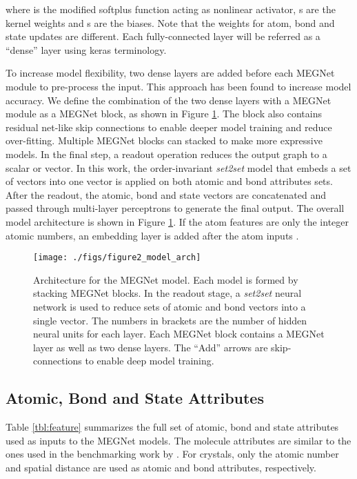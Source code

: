 \documentclass[manuscript=article]{achemso}
\begin{document}
where  is the modified softplus function\cite{Schutt2017} acting as nonlinear activator, s are the kernel weights and s are the biases. Note that the weights for atom, bond and state updates are different. Each fully-connected layer will be referred as a ``dense'' layer using keras\cite{chollet2015keras} terminology. 

To increase model flexibility, two dense layers are added before each MEGNet module to pre-process the input. This approach has been found to increase model accuracy. We define the combination of the two dense layers with a MEGNet module as a MEGNet block, as shown in Figure \ref{fig:model_arch}. The block also contains residual net-like\cite{he2016deep} skip connections to enable deeper model training and reduce over-fitting. Multiple MEGNet blocks can stacked to make more expressive models.  In the final step, a readout operation reduces the output graph to a scalar or vector. In this work, the order-invariant \textit{set2set} model\cite{Vinyals2015} that embeds a set of vectors into one vector is applied on both atomic and bond attributes sets. After the readout, the atomic, bond and state vectors are concatenated and passed through multi-layer perceptrons to generate the final output. The overall model architecture is shown in Figure \ref{fig:model_arch}. If the atom features are only the integer atomic numbers, an embedding layer is added after the atom inputs .

\begin{figure}[htp]
\texttt{[image: ./figs/figure2\_model\_arch]}
\caption{\label{fig:model_arch}Architecture for the MEGNet model. Each model is formed by stacking MEGNet blocks. In the readout stage, a \textit{set2set} neural network is used to reduce sets of atomic and bond vectors into a single vector. The numbers in brackets are the number of hidden neural units for each layer. Each MEGNet block contains a MEGNet layer as well as two dense layers. The ``Add'' arrows are skip-connections to enable deep model training.} 
\end{figure}

\subsection{Atomic, Bond and State Attributes}

Table \ref{tbl:feature} summarizes the full set of atomic, bond and state attributes used as inputs to the MEGNet models. The molecule attributes are similar to the ones used in the benchmarking work by \citet{Faber2017}. For crystals, only the atomic number and spatial distance are used as atomic and bond attributes, respectively.
\end{document}
